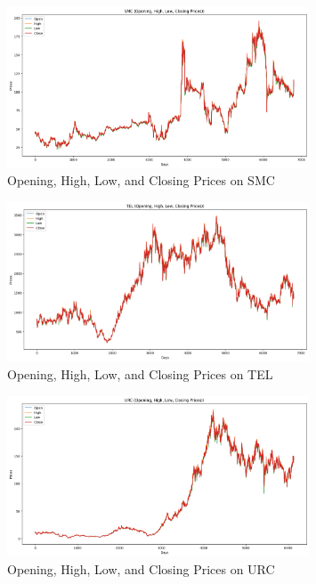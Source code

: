 \begin{figure}[ht]
    \centering
    \includegraphics[width=0.80\textwidth]{./assets/Appendices/B/OHLC_Prices/SMC.png}
    \caption{Opening, High, Low, and Closing Prices on SMC}
    \label{fig:ohlc_SMC}
\end{figure}
\FloatBarrier

\begin{figure}[ht]
    \centering
    \includegraphics[width=0.80\textwidth]{./assets/Appendices/B/OHLC_Prices/TEL.png}
    \caption{Opening, High, Low, and Closing Prices on TEL}
    \label{fig:ohlc_TEL}
\end{figure}
\FloatBarrier

\begin{figure}[ht]
    \centering
    \includegraphics[width=0.80\textwidth]{./assets/Appendices/B/OHLC_Prices/URC.png}
    \caption{Opening, High, Low, and Closing Prices on URC}
    \label{fig:ohlc_URC}
\end{figure}
\FloatBarrier


